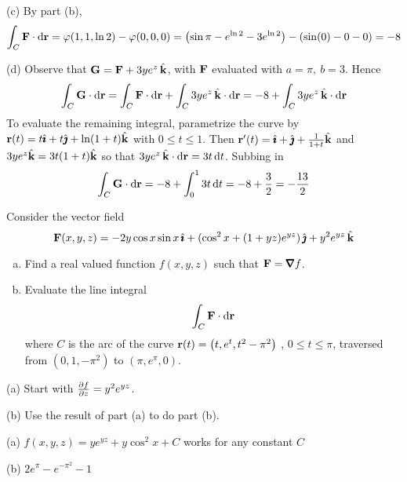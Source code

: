 \begin{solution}
(c) By part (b),
$$
\int _C\mathbf{F}\cdot \mathrm{d}\mathbf{r}
=\varphi(1,1,\ln 2)-\varphi(0,0,0)
=\left(\sin\pi-e^{\ln 2}-3e^{\ln 2}\right)-\left(\sin(0)-0-0\right)
=-8
$$

(d) 
Observe that $\mathbf{G}=\mathbf{F}+3ye^z\,\hat{\mathbf{k}}$, with $\mathbf{F}$ evaluated with
$a=\pi,\ b=3$. Hence
$$
\int _C\mathbf{G}\cdot \mathrm{d}\mathbf{r}=\int _C\mathbf{F}\cdot \mathrm{d}\mathbf{r}
+\int _C3ye^z\,\hat{\mathbf{k}}\cdot \mathrm{d}\mathbf{r}
=-8+\int _C3ye^z\,\hat{\mathbf{k}}\cdot \mathrm{d}\mathbf{r}
$$
To evaluate the remaining integral, parametrize the curve by $\mathbf{r}(t)
=t\hat{\pmb{\imath}}+t\hat{\pmb{\jmath}}+\ln(1+t)\hat{\mathbf{k}}$ with $0\le t\le 1$. Then $\mathbf{r}'(t)=\hat{\pmb{\imath}}+\hat{\pmb{\jmath}}+\frac{1}{1+t}\hat{\mathbf{k}}$ and
$3ye^z\hat{\mathbf{k}}=3t(1+t)\hat{\mathbf{k}}$ so that $3ye^z\,\hat{\mathbf{k}}\cdot \mathrm{d}\mathbf{r}=3t\,\mathrm{d}t$. Subbing in
$$
\int _C\mathbf{G}\cdot \mathrm{d}\mathbf{r}
=-8+\int_0^13t\,\mathrm{d}t
=-8+\frac{3}{2}=-\frac{13}{2}
$$
\end{solution}


\begin{question}[M317 2007A] %
Consider the vector field
\begin{equation*}
\mathbf{F}(x, y, z) = -2y \cos x \sin x\,\hat{\pmb{\imath}} + (\cos^2 x + (1 + yz) e^{yz} )\,\hat{\pmb{\jmath}} 
                + y^2 e^{yz}\,\hat{\mathbf{k}}
\end{equation*}
\begin{enumerate}[(a)]
\item
Find a real valued function $f (x, y, z)$ such that $\vF = \vnabla f$.
\item
Evaluate the line integral
\begin{equation*}
\int_C \mathbf{F} \cdot \mathrm{d}\mathbf{r}
\end{equation*}
where $C$ is the arc of the curve 
$\mathbf{r}(t) = \big(t, e^t , t^2 - \pi^2\big)$ , $0 \le t \le \pi$,
traversed from  $(0, 1, -\pi^2 )$ to $(\pi, e^\pi , 0)$.
\end{enumerate}
\end{question}

\begin{hint} 
(a) Start with $\pdiff{f}{z} = y^2e^{yz}$.

(b) Use the result of part (a) to do part (b).
\end{hint}

\begin{answer} 
(a) $f(x,y,z) =  ye^{yz} + y\cos^2 x + C$  works for any constant $C$\qquad

(b) $2e^\pi-e^{-\pi^2}-1$
\end{answer}


